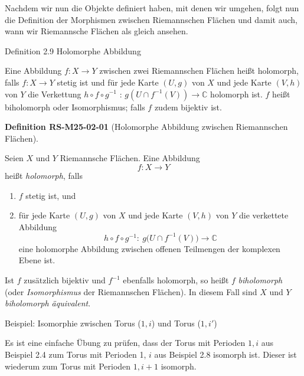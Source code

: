 \documentclass[10pt, letterpaper]{article}
\newcommand{\C}{\mathbb{C}}
\newcommand{\CustomHeading}[3]{%
  \par\medskip\noindent%
  \textbf{#1 #2} \textnormal{(#3)}.\enskip%
}
\newenvironment{DEF}[2]{\begin{unitbox}\CustomHeading{Definition}{#1}{#2}}{\end{unitbox}}
\begin{document}
Nachdem wir nun die Objekte definiert haben, mit denen wir umgehen, folgt nun die Definition der Morphismen zwischen Riemannschen Flächen und damit auch, wann wir Riemannsche Flächen als gleich ansehen.

Definition 2.9 Holomorphe Abbildung

Eine Abbildung $f: X \rightarrow Y$ zwischen zwei Riemannschen Flächen heißt holomorph, falls $f: X \rightarrow Y$ stetig ist und für jede Karte $(U, g)$ von $X$ und jede Karte $(V, h)$ von $Y$ die Verkettung $h \circ f \circ g^{-1}$ : $g\left(U \cap f^{-1}(V)\right) \rightarrow \mathbb{C}$ holomorph ist. $f$ heißt biholomorph oder Isomorphismus; falls $f$ zudem bijektiv ist.


\begin{DEF}{RS-M25-02-01}{Holomorphe Abbildung zwischen Riemannschen Flächen}
Seien $X$ und $Y$ Riemannsche Flächen.  
Eine Abbildung
\[
f:X\longrightarrow Y
\]
heißt \emph{holomorph}, falls
\begin{enumerate}
\item $f$ stetig ist, und
\item für jede Karte $(U,g)$ von $X$ und jede Karte $(V,h)$ von $Y$ die verkettete Abbildung
\[
h\circ f\circ g^{-1}:\ g\bigl(U\cap f^{-1}(V)\bigr)\longrightarrow \C
\]
eine holomorphe Abbildung zwischen offenen Teilmengen der komplexen Ebene ist.
\end{enumerate}

Ist $f$ zusätzlich bijektiv und $f^{-1}$ ebenfalls holomorph, so heißt $f$ \emph{biholomorph}  
(oder \emph{Isomorphismus} der Riemannschen Flächen). In diesem Fall sind $X$ und $Y$ \emph{biholomorph äquivalent}.
\end{DEF}


Beispiel: Isomorphie zwischen Torus ($1,i$) und Torus ($1,i'$)

Es ist eine einfache Übung zu prüfen, dass der Torus mit Perioden $1, i$ aus Beispiel 2.4 zum Torus mit Perioden 1, $i$ aus Beispiel 2.8 isomorph ist. Dieser ist wiederum zum Torus mit Perioden $1, i+1$ isomorph.
\end{document}
